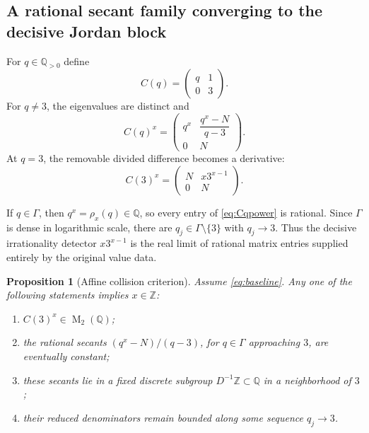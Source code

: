 \documentclass[11pt,oneside]{article}
\newtheorem{proposition}[theorem]{Proposition}
\theoremstyle{definition}
\theoremstyle{remark}
\newcommand{\Z}{\mathbb Z}
\newcommand{\Q}{\mathbb Q}
\newcommand{\Mat}{\operatorname{M}}
\begin{document}
\subsection{A rational secant family converging to the decisive Jordan block}

For $q\in\Q_{>0}$ define
\begin{equation}
 C(q)=\begin{pmatrix}q&1\\0&3\end{pmatrix}.
 \label{eq:Cq}
\end{equation}
For $q\ne3$, the eigenvalues are distinct and
\begin{equation}
 C(q)^x=
 \begin{pmatrix}
 q^x&\dfrac{q^x-N}{q-3}\\[1.2ex]
 0&N
 \end{pmatrix}.
 \label{eq:Cqpower}
\end{equation}
At $q=3$, the removable divided difference becomes a derivative:
\begin{equation}
 C(3)^x=
 \begin{pmatrix}
 N&x3^{x-1}\\0&N
 \end{pmatrix}.
 \label{eq:C3power}
\end{equation}

If $q\in\Gamma$, then $q^x=\rho_x(q)\in\Q$, so every entry of
\eqref{eq:Cqpower} is rational.  Since $\Gamma$ is dense in logarithmic scale, there are
$q_j\in\Gamma\setminus\{3\}$ with $q_j\to3$.  Thus the decisive irrationality detector
$x3^{x-1}$ is the real limit of rational matrix entries supplied entirely by the original
value data.

\begin{proposition}[Affine collision criterion]
\label{prop:affinecriterion}
Assume \eqref{eq:baseline}.  Any one of the following statements implies $x\in\Z$:
\begin{enumerate}
\item $C(3)^x\in\Mat_2(\Q)$;
\item the rational secants $(q^x-N)/(q-3)$, for $q\in\Gamma$ approaching $3$, are eventually
constant;
\item these secants lie in a fixed discrete subgroup $D^{-1}\Z\subset\Q$ in a neighborhood of
$3$;
\item their reduced denominators remain bounded along some sequence $q_j\to3$.
\end{enumerate}
\end{proposition}
\end{document}
